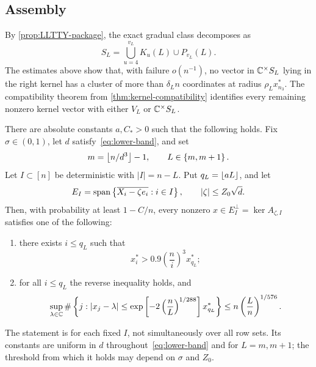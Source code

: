 \subsection{Assembly}

By 
\cref{prop:LLTTY-package}, the exact gradual class decomposes as
\begin{equation}\label{eq:SL-decomposition-vL}
  S_L=\bigcup_{u=4}^{v_L}K_u(L)\cup P_{v_L}(L).
\end{equation}
The estimates above show that, with failure $o(n^{-1})$, no vector in $\mathbb C^{\times}S_L$ lying in the right kernel has a cluster of more than $\delta_Ln$ coordinates at radius $\rho_Lx_{n_3}^*$. The compatibility theorem from 
\cref{thm:kernel-compatibility} identifies every remaining nonzero kernel vector with either $V_L$ or $\mathbb C^{\times}S_L$.

\begin{theorem}\label{thm:row-slice-structural}
There are absolute constants $a,C_*>0$ such that the following holds. Fix $\sigma\in(0,1)$, let $d$ satisfy~\eqref{eq:lower-band}, and set
\[
  m=\left\lfloor n/d^3\right\rfloor-1,
  \qquad
  L\in\left\{m,m+1\right\}.
\]
Let $I\subset[n]$ be deterministic with $|I|=n-L$. Put $q_L=\left\lfloor aL\right\rfloor$, and let
\[
  E_I=\operatorname{span}\left\{\overline{X_i-\zeta e_i}:i\in I\right\},
  \qquad
  |\zeta|\le Z_0\sqrt d.
\]
Then, with probability at least $1-C/n$, every nonzero $x\in E_I^\perp=\ker A_{\zeta,I}$ satisfies one of the following:
\begin{enumerate}[label=\textup{(\roman*)}]
\item there exists $i\le q_L$ such that
\[
  x_i^*>0.9\left(\frac ni\right)^3x_{q_L}^*;
\]
\item for all $i\le q_L$ the reverse inequality holds, and
\[
  \sup_{\lambda\in\mathbb C}
  \#\left\{j:|x_j-\lambda|
  \le\exp\left[-2\left(\frac nL\right)^{1/288}\right]x_{q_L}^*\right\}
  \le n\left(\frac Ln\right)^{1/576}.
\]
\end{enumerate}
The statement is for each fixed $I$, not simultaneously over all row sets. Its constants are uniform in $d$ throughout~\eqref{eq:lower-band} and for $L=m,m+1$; the threshold from which it holds may depend on $\sigma$ and $Z_0$.
\end{theorem}

